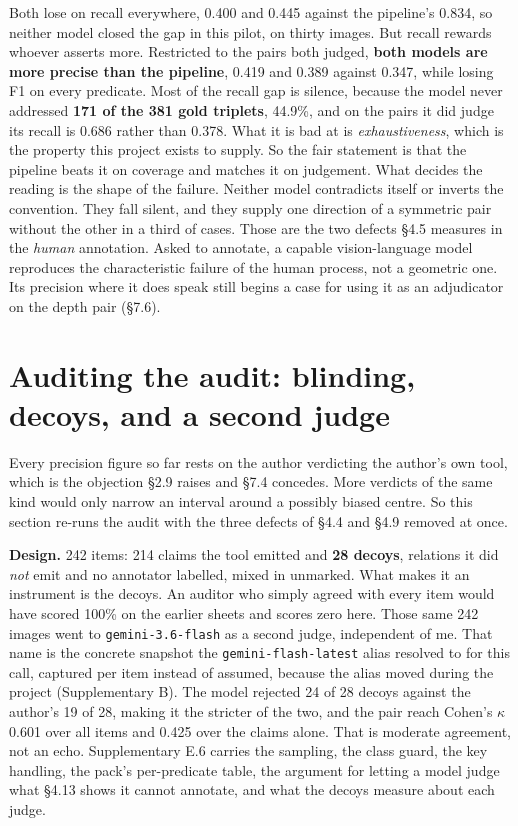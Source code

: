 Both lose on recall everywhere, 0.400 and 0.445 against the pipeline's 0.834, so neither model closed the gap in this pilot, on thirty images. But recall rewards whoever asserts more. Restricted to the pairs both judged, \textbf{both models are more precise than the pipeline}, 0.419 and 0.389 against 0.347, while losing F1 on every predicate. Most of the recall gap is silence, because the model never addressed \textbf{171 of the 381 gold triplets}, 44.9\%, and on the pairs it did judge its recall is 0.686 rather than 0.378. What it is bad at is \textit{exhaustiveness}, which is the property this project exists to supply. So the fair statement is that the pipeline beats it on coverage and matches it on judgement. What decides the reading is the shape of the failure. Neither model contradicts itself or inverts the convention. They fall silent, and they supply one direction of a symmetric pair without the other in a third of cases. Those are the two defects \S{}4.5 measures in the \textit{human} annotation. Asked to annotate, a capable vision-language model reproduces the characteristic failure of the human process, not a geometric one. Its precision where it does speak still begins a case for using it as an adjudicator on the depth pair (\S{}7.6).

\section{Auditing the audit: blinding, decoys, and a second judge}

Every precision figure so far rests on the author verdicting the author's own tool, which is the objection \S{}2.9 raises and \S{}7.4 concedes. More verdicts of the same kind would only narrow an interval around a possibly biased centre. So this section re-runs the audit with the three defects of \S{}4.4 and \S{}4.9 removed at once.

\textbf{Design.} 242 items: 214 claims the tool emitted and \textbf{28 decoys}, relations it did \textit{not} emit and no annotator labelled, mixed in unmarked. What makes it an instrument is the decoys. An auditor who simply agreed with every item would have scored 100\% on the earlier sheets and scores zero here. Those same 242 images went to \texttt{gemini-3.6-flash} as a second judge, independent of me. That name is the concrete snapshot the \texttt{gemini-flash-latest} alias resolved to for this call, captured per item instead of assumed, because the alias moved during the project (Supplementary B). The model rejected 24 of 28 decoys against the author's 19 of 28, making it the stricter of the two, and the pair reach Cohen's $\kappa$ 0.601 over all items and 0.425 over the claims alone. That is moderate agreement, not an echo. Supplementary E.6 carries the sampling, the class guard, the key handling, the pack's per-predicate table, the argument for letting a model judge what \S{}4.13 shows it cannot annotate, and what the decoys measure about each judge.

